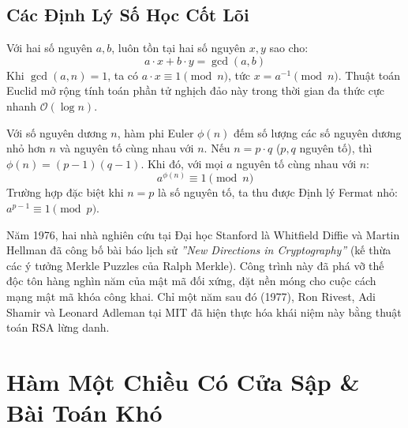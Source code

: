 \subsection{Các Định Lý Số Học Cốt Lõi}

\begin{theorem}
Với hai số nguyên $a, b$, luôn tồn tại hai số nguyên $x, y$ sao cho:
\begin{equation}
a \cdot x + b \cdot y = \gcd(a, b)
\end{equation}
Khi $\gcd(a, n) = 1$, ta có $a \cdot x \equiv 1 \pmod n$, tức $x = a^{-1} \pmod n$. Thuật toán Euclid mở rộng tính toán phần tử nghịch đảo này trong thời gian đa thức cực nhanh $\mathcal{O}(\log n)$.
\Endtheorem
\end{theorem}

\begin{theorem}
Với số nguyên dương $n$, hàm phi Euler $\phi(n)$ đếm số lượng các số nguyên dương nhỏ hơn $n$ và nguyên tố cùng nhau với $n$. Nếu $n = p \cdot q$ ($p, q$ nguyên tố), thì $\phi(n) = (p - 1)(q - 1)$. Khi đó, với mọi $a$ nguyên tố cùng nhau với $n$:
\begin{equation}
a^{\phi(n)} \equiv 1 \pmod n
\end{equation}
Trường hợp đặc biệt khi $n = p$ là số nguyên tố, ta thu được Định lý Fermat nhỏ: $a^{p-1} \equiv 1 \pmod p$.
\Endtheorem
\end{theorem}

\begin{lichsu}
Năm 1976, hai nhà nghiên cứu tại Đại học Stanford là Whitfield Diffie và Martin Hellman đã công bố bài báo lịch sử \emph{''New Directions in Cryptography''} (kế thừa các ý tưởng Merkle Puzzles của Ralph Merkle). Công trình này đã phá vỡ thế độc tôn hàng nghìn năm của mật mã đối xứng, đặt nền móng cho cuộc cách mạng mật mã khóa công khai. Chỉ một năm sau đó (1977), Ron Rivest, Adi Shamir và Leonard Adleman tại MIT đã hiện thực hóa khái niệm này bằng thuật toán RSA lừng danh.
\end{lichsu}

\section{Hàm Một Chiều Có Cửa Sập \& Bài Toán Khó}

